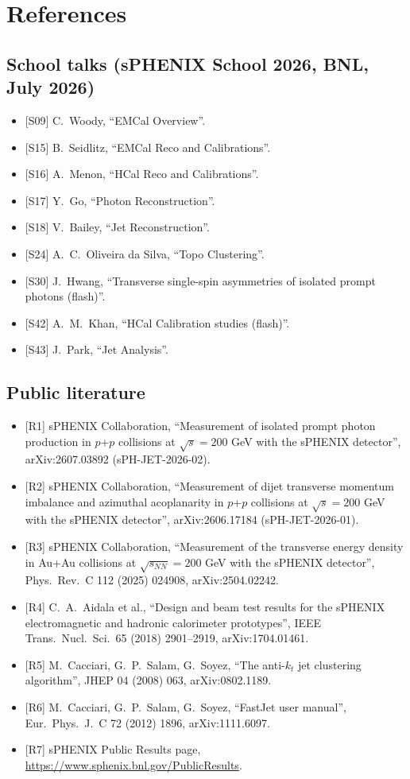 \documentclass[11pt,letterpaper]{article}
\begin{document}
\section*{References}
\subsection*{School talks (sPHENIX School 2026, BNL, July 2026)}
\begin{itemize}
\item {[S09]} C.~Woody, ``EMCal Overview''.
\item {[S15]} B.~Seidlitz, ``EMCal Reco and Calibrations''.
\item {[S16]} A.~Menon, ``HCal Reco and Calibrations''.
\item {[S17]} Y.~Go, ``Photon Reconstruction''.
\item {[S18]} V.~Bailey, ``Jet Reconstruction''.
\item {[S24]} A.~C.~Oliveira da Silva, ``Topo Clustering''.
\item {[S30]} J.~Hwang, ``Transverse single-spin asymmetries of isolated prompt photons (flash)''.
\item {[S42]} A.~M.~Khan, ``HCal Calibration studies (flash)''.
\item {[S43]} J.~Park, ``Jet Analysis''.
\end{itemize}
\subsection*{Public literature}
\begin{itemize}
\item {[R1]} sPHENIX Collaboration, ``Measurement of isolated prompt photon production in $p$+$p$ collisions at $\sqrt{s}=200$ GeV with the sPHENIX detector'', arXiv:2607.03892 (sPH-JET-2026-02).
\item {[R2]} sPHENIX Collaboration, ``Measurement of dijet transverse momentum imbalance and azimuthal acoplanarity in $p$+$p$ collisions at $\sqrt{s}=200$ GeV with the sPHENIX detector'', arXiv:2606.17184 (sPH-JET-2026-01).
\item {[R3]} sPHENIX Collaboration, ``Measurement of the transverse energy density in Au+Au collisions at $\sqrt{s_{NN}}=200$ GeV with the sPHENIX detector'', Phys.\ Rev.\ C 112 (2025) 024908, arXiv:2504.02242.
\item {[R4]} C.~A.~Aidala et al., ``Design and beam test results for the sPHENIX electromagnetic and hadronic calorimeter prototypes'', IEEE Trans.\ Nucl.\ Sci.\ 65 (2018) 2901--2919, arXiv:1704.01461.
\item {[R5]} M.~Cacciari, G.~P.~Salam, G.~Soyez, ``The anti-$k_t$ jet clustering algorithm'', JHEP 04 (2008) 063, arXiv:0802.1189.
\item {[R6]} M.~Cacciari, G.~P.~Salam, G.~Soyez, ``FastJet user manual'', Eur.\ Phys.\ J.\ C 72 (2012) 1896, arXiv:1111.6097.
\item {[R7]} sPHENIX Public Results page, \url{https://www.sphenix.bnl.gov/PublicResults}.
\end{itemize}
\end{document}
